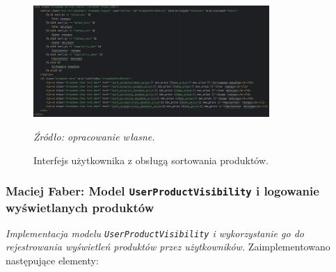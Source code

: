 \documentclass[12pt,a4paper,oneside]{article}
\theoremstyle{definition}
\numberwithin{equation}{section}
\begin{document}
\begin{figure}[H]
    \centering
    \includegraphics[width=0.8\textwidth]{images/krzysztofBImages/html_sorting.png}
    \caption{Interfejs użytkownika z obsługą sortowania produktów.}
    \emph{Źródło: opracowanie własne.}
    \label{fig:sorting_html}
\end{figure}
%
%
\subsubsection{Maciej Faber: Model \texttt{UserProductVisibility} i logowanie wyświetlanych produktów}
\label{section:1.3.47}
\textit{
Implementacja modelu \texttt{UserProductVisibility} i wykorzystanie go do rejestrowania wyświetleń produktów przez użytkowników.
}
Zaimplementowano następujące elementy:
\end{document}
